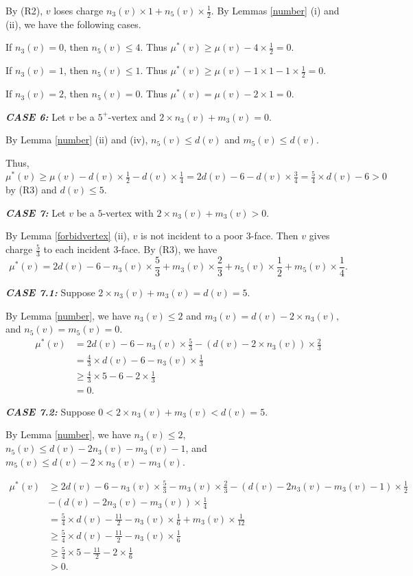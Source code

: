 \documentclass[11pt]{amsart} %
\theoremstyle{definition}
\begin{document}
By (R2),  $v$ loses charge $n_3(v)\times1+n_5(v)\times\frac{1}{2}$. 
By Lemmas \ref{number} (i) and (ii), we have the following cases. 

If $n_3(v)=0$, then $n_5(v)\leq4$. 
Thus $\mu^*(v)\geq \mu(v)-4\times\frac{1}{2}=0.$

If $n_3(v)=1$, then $n_5(v)\leq1$. 
Thus $\mu^*(v)\geq \mu(v)-1\times1-1\times\frac{1}{2}=0.$

If $n_3(v)=2$, then $n_5(v)=0$. 
Thus $\mu^*(v)= \mu(v)-2\times1=0.$ 

\noindent\textit{\textbf{CASE 6:}} Let $v$ be a $5^+$-vertex and $2\times n_3(v)+m_3(v)=0$. 

By Lemma \ref{number} (ii) and (iv), $n_5(v)\leq d(v)$ and $m_5(v)\leq d(v).$

Thus, 
$\mu^*(v) \geq \mu(v)-d(v)\times\frac{1}{2}-d(v)\times\frac{1}{4}
=2d(v)-6-d(v)\times \frac{3}{4}=\frac{5}{4}\times d(v)-6>0$ 
by (R3) and $d(v)\leq 5$.

\noindent\textit{\textbf{CASE 7:}} 
Let $v$ be a $5$-vertex with $2\times n_3(v)+m_3(v)>0$. 

By Lemma \ref{forbidvertex} (ii), 
$v$ is not incident  to a poor $3$-face. 
Then $v$ gives charge $\frac{5}{3}$ to each incident $3$-face. 
By (R3), we have\\
$$
\mu^*(v)=2d(v)-6-n_3(v)\times\frac{5}{3}+m_3(v)\times\frac{2}{3}+n_5(v)\times\frac{1}{2}+m_5(v)\times\frac{1}{4}.
$$

\textit{\textbf{CASE 7.1:}} 
Suppose $2\times n_3(v)+m_3(v)=d(v)=5$. 

By Lemma \ref{number}, we have $n_3(v)\leq2$ and  $m_3(v)= d(v)-2\times n_3(v),$ and $n_5(v)=m_5(v)=0.$
\begin{align*}
\mu^*(v)&=2d(v)-6-n_3(v)\times\frac{5}{3}-(d(v)-2\times n_3(v))\times\frac{2}{3}\\
&=\frac{4}{3}\times d(v)-6-n_3(v)\times\frac{1}{3}\\
&\geq\frac{4}{3}\times 5-6-2\times\frac{1}{3}\\
&= 0.
\end{align*} 



\textit{\textbf{CASE 7.2:}} 
Suppose $0<2\times n_3(v)+m_3(v)<d(v)=5$.

By Lemma \ref{number}, we have $n_3(v)\leq2$,  
$n_5(v)\leq d(v)-2n_3(v)-m_3(v)-1$, 
and $m_5(v)\leq d(v)-2\times n_3(v)-m_3(v).$

\begin{align*}
\mu^*(v)&\geq 2d(v)-6-n_3(v)\times\frac{5}{3}-m_3(v)\times\frac{2}{3}-(d(v)-2n_3(v)-m_3(v)-1)\times\frac{1}{2}\\
& -(d(v)-2n_3(v)-m_3(v))\times\frac{1}{4}\\
&=\frac{5}{4}\times d(v)-\frac{11}{2}-n_3(v)\times\frac{1}{6}+m_3(v)
\times\frac{1}{12}\\
&\geq \frac{5}{4}\times d(v)-\frac{11}{2}-n_3(v)\times\frac{1}{6}\\
&\geq \frac{5}{4}\times 5-\frac{11}{2}-2\times\frac{1}{6}\\
&> 0.
\end{align*}
\end{document}
